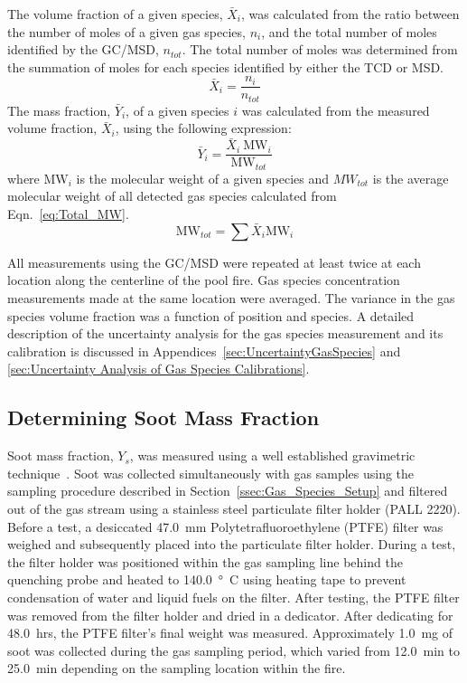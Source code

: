 \documentclass[12pt]{article}
\begin{document}
The volume fraction of a given species, $\bar{X}_{i}$, was calculated from the ratio between the number of moles of a given gas species, $n_{i}$, and the total number of moles identified by the GC/MSD, $n_{tot}$. The total number of moles was determined from the summation of moles for each species identified by either the TCD or MSD.
\begin{equation}\label{eq:volume_fraction}
  	\bar{X}_{i}= \frac{n_{i}}{n_{tot}}
\end{equation}
The mass fraction, $\bar{Y}_{i}$, of a given species $i$ was calculated from the measured volume fraction, $\bar{X}_{i}$, using the following expression:
\begin{equation}\label{eq:mass_fraction}
	\bar{Y}_{i}=\frac{\bar{X}_{i}~{\textrm{MW}_{i}}}{{\textrm{MW}_{tot}}}
\end{equation}
where ${{\textrm{MW}_{i}}}$ is the molecular weight of a given species and ${{MW_{tot}}}$ is the average molecular weight of all detected gas species calculated from Eqn.~\ref{eq:Total_MW}. 
\begin{equation}\label{eq:Total_MW}
	{\textrm{MW}_{tot}}=\sum{\bar{X}_{i}{\textrm{MW}_{i}}}
\end{equation}

All measurements using the GC/MSD were repeated at least twice at each location along the centerline of the pool fire. Gas species concentration measurements made at the same location were averaged. The variance in the gas species volume fraction was a function of position and species. A detailed description of the uncertainty analysis for the gas species measurement and its calibration is discussed in Appendices~\ref{sec:UncertaintyGasSpecies} and \ref{sec:Uncertainty Analysis of Gas Species Calibrations}.

\subsection{Determining Soot Mass Fraction}
\label{ssec:Soot_Setup}

Soot mass fraction, $Y_{s}$, was measured using a well established gravimetric technique~\cite{Choi1995}. Soot was collected simultaneously with gas samples using the sampling procedure described in Section~\ref{ssec:Gas_Species_Setup} and filtered out of the gas stream using a stainless steel particulate filter holder (PALL 2220).  Before a test, a desiccated \SI{47.0}{mm} Polytetrafluoroethylene (PTFE) filter was weighed and subsequently placed into the particulate filter holder. During a test, the filter holder was positioned within the gas sampling line behind the quenching probe and heated to \SI{140.0}{\degree C} using heating tape to prevent condensation of water and liquid fuels on the filter. After testing, the PTFE filter was removed from the filter holder and dried in a dedicator. After dedicating for \SI{48.0}{hrs}, the PTFE filter’s final weight was measured. Approximately \SI{1.0}{mg} of soot was collected during the gas sampling period, which varied from \SI{12.0}{min} to \SI{25.0}{min} depending on the sampling location within the fire.
\end{document}
